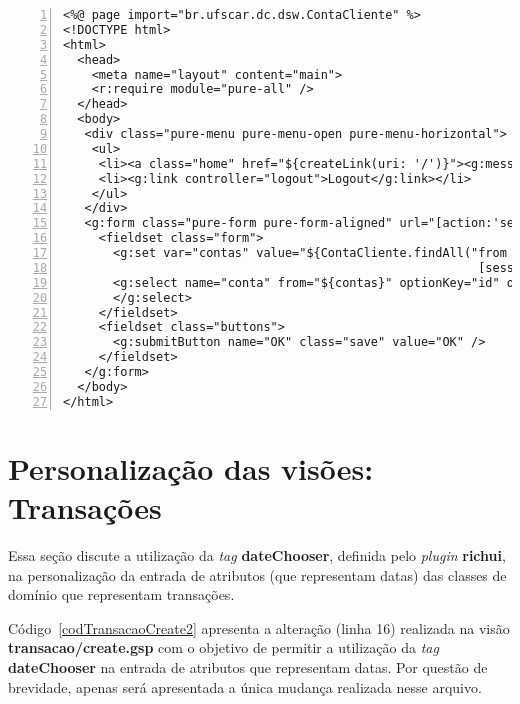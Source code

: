\vspace{0.5cm}
\begin{lstlisting}[numbers=left,  caption=Visão  {\bf selecionaConta/index.gsp},
    frame=trBL, float=htbp, label=codSelecionaContaIndex2] 
<%@ page import="br.ufscar.dc.dsw.ContaCliente" %>
<!DOCTYPE html>
<html>
  <head>
    <meta name="layout" content="main">
    <r:require module="pure-all" />
  </head>
  <body>
   <div class="pure-menu pure-menu-open pure-menu-horizontal">
    <ul>
     <li><a class="home" href="${createLink(uri: '/')}"><g:message code="default.home.label"/></a></li>
     <li><g:link controller="logout">Logout</g:link></li>
    </ul>
   </div>
   <g:form class="pure-form pure-form-aligned" url="[action:'selected']" >
     <fieldset class="form">
       <g:set var="contas" value="${ContaCliente.findAll("from ContaCliente as cc where cc.cliente = ?", 
                                                          [session.cliente])}" />
       <g:select name="conta" from="${contas}" optionKey="id" optionValue="conta">
       </g:select>
     </fieldset>
     <fieldset class="buttons">
       <g:submitButton name="OK" class="save" value="OK" />
     </fieldset>
   </g:form>
  </body>
</html>
\end{lstlisting}

\newpage

\section{Personalização das visões: Transações}

\vspace{0.5cm}

Essa seção  discute a utilização da  {\it tag} {\bf  dateChooser}, definida pelo
{\it  plugin} {\bf  richui},  na  personalização da  entrada  de atributos  (que
representam datas) das classes de domínio que representam transações. 

Código~\ref{codTransacaoCreate2} apresenta  a alteração (linha  16) realizada na
visão {\bf transacao/create.gsp} com o objetivo de permitir a utilização da {\it
  tag}  {\bf dateChooser}  na entrada  de atributos  que representam  datas. Por
questão de  brevidade, apenas será  apresentada a única mudança  realizada nesse
arquivo.  

\vspace{0.3cm}

